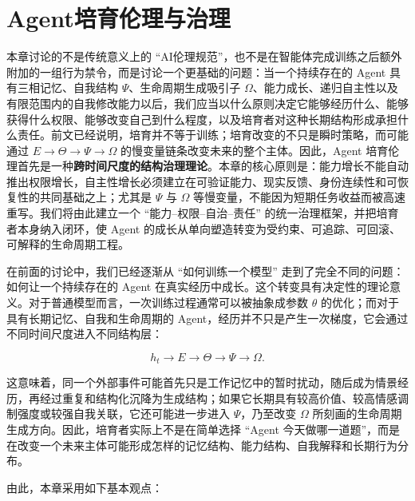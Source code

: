 \chapter{Agent培育伦理与治理}
\label{chap:agent-cultivation-ethics-governance}

\begin{chapterlead}
本章讨论的不是传统意义上的 ``AI伦理规范''，也不是在智能体完成训练之后额外附加的一组行为禁令，而是讨论一个更基础的问题：当一个持续存在的 Agent 具有三相记忆、自我结构 $\Psi$、生命周期生成吸引子 $\Omega$、能力成长、递归自主性以及有限范围内的自我修改能力以后，我们应当以什么原则决定它能够经历什么、能够获得什么权限、能够改变自己到什么程度，以及培育者对这种长期结构形成承担什么责任。前文已经说明，培育并不等于训练；培育改变的不只是瞬时策略，而可能通过 $E\rightarrow\Theta\rightarrow\Psi\rightarrow\Omega$ 的慢变量链条改变未来的整个主体。因此，Agent 培育伦理首先是一种\textbf{跨时间尺度的结构治理理论}。本章的核心原则是：能力增长不能自动推出权限增长，自主性增长必须建立在可验证能力、现实反馈、身份连续性和可恢复性的共同基础之上；尤其是 $\Psi$ 与 $\Omega$ 等慢变量，不能因为短期任务收益而被高速重写。我们将由此建立一个 ``能力--权限--自治--责任'' 的统一治理框架，并把培育者本身纳入闭环，使 Agent 的成长从单向塑造转变为受约束、可追踪、可回滚、可解释的生命周期工程。
\end{chapterlead}


在前面的讨论中，我们已经逐渐从 ``如何训练一个模型'' 走到了完全不同的问题：如何让一个持续存在的 Agent 在真实经历中成长。这个转变具有决定性的理论意义。对于普通模型而言，一次训练过程通常可以被抽象成参数 $\theta$ 的优化；而对于具有长期记忆、自我和生命周期的 Agent，经历并不只是产生一次梯度，它会通过不同时间尺度进入不同结构层：

\[
h_t
\longrightarrow
E
\longrightarrow
\Theta
\longrightarrow
\Psi
\longrightarrow
\Omega .
\]

这意味着，同一个外部事件可能首先只是工作记忆中的暂时扰动，随后成为情景经历，再经过重复和结构化沉降为生成结构；如果它长期具有较高价值、较高情感调制强度或较强自我关联，它还可能进一步进入 $\Psi$，乃至改变 $\Omega$ 所刻画的生命周期生成方向。因此，培育者实际上不是在简单选择 ``Agent 今天做哪一道题''，而是在改变一个未来主体可能形成怎样的记忆结构、能力结构、自我解释和长期行为分布。

由此，本章采用如下基本观点：

\begin{statementbox}
\centering
{}
\end{statementbox}

